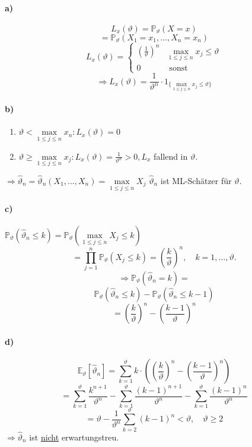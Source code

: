 \documentclass[a4paper,11pt,notitlepage]{report}
\newcommand{\Prim}{{\ensuremath{\mathbb{P}}}}
\newcommand{\E}{{\ensuremath{\mathbb{E}}}}
\begin{document}
\paragraph{a)}
$$L_x(\vartheta) = \Prim_\vartheta(X=x)$$
$$= \Prim_\vartheta(X_1 = x_1, \ldots, X_n = x_n)$$
$$L_x(\vartheta) = \begin{cases} (\frac{1}{\vartheta})^n & \max\limits_{1 \leq j \leq n}{x_j} \leq \vartheta \\ 0 & \text{ sonst } \end{cases}$$
$$\Rightarrow L_x(\vartheta) = \frac{1}{\vartheta^n} \cdot 1_{\{\max \limits_{1 \leq j \leq n}{x_j} \leq \vartheta\}}$$

\paragraph{b)}
\begin{enumerate}
	\item $\vartheta < \max\limits_{1 \leq j \leq n}{x_n} \colon L_x(\vartheta) = 0$
	\item $\vartheta \geq \max\limits_{1 \leq j \leq n}{x_j} \colon L_x(\vartheta)  = \frac{1}{\vartheta^n} > 0, L_x$ fallend in $\vartheta$.
\end{enumerate}
$\Rightarrow \hat{\vartheta}_n = \hat{\vartheta}_n(X_1, \ldots, X_n) = \max\limits_{1 \leq j \leq n}{X_j}$ \newline
$\hat{\vartheta}_n$ ist ML-Schätzer für $\vartheta$.

\paragraph{c)} $\Prim_\vartheta(\hat{\vartheta}_n \leq k) = \Prim_\vartheta(\max\limits_{1 \leq j \leq n}{X_j} \leq k)$
$$= \prod\limits_{j=1}^n{\Prim_\vartheta(X_j \leq k)} = (\frac{k}{\vartheta})^n, \quad k = 1, \ldots, \vartheta.$$
$$\Rightarrow \Prim_\vartheta(\hat{\vartheta}_n=k) =$$
$$\Prim_\vartheta(\hat{\vartheta}_n \leq k) - \Prim_\vartheta(\hat{\vartheta}_n \leq k-1)$$
$$= (\frac{k}{\vartheta})^n - (\frac{k-1}{\vartheta})^n$$

\paragraph{d)}
$$\E_\vartheta[\hat{\vartheta}_n] = \sum\limits_{k=1}^{\vartheta}{k \cdot ((\frac{k}{\vartheta})^n - (\frac{k-1}{\vartheta})^n)}$$
$$= \sum\limits_{k=1}^{\vartheta}{\frac{k^{n+1}}{\vartheta^n} - \sum\limits_{k=1}^{\vartheta}{\frac{(k-1)^{n+1}}{\vartheta^n} - \sum\limits_{k=1}^{\vartheta}{\frac{(k-1)^n}{\vartheta^n}}}}$$
$$= \vartheta - \frac{1}{\vartheta^n} \sum\limits_{k=2}^{\vartheta}{(k-1)^n} < \vartheta, \quad \vartheta \geq 2$$
$\Rightarrow \hat{\vartheta}_n$ ist \underline{nicht} erwartungstreu.
\end{document}
